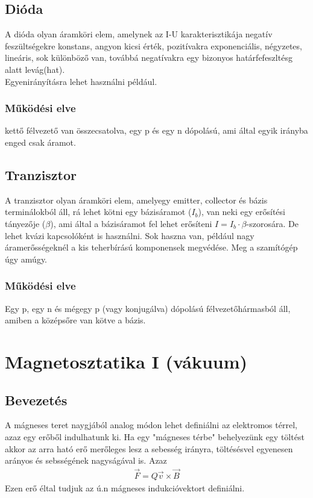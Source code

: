 \documentclass{article}
\begin{document}
\subsection{Dióda}
A dióda olyan áramköri elem, amelynek az I-U karakterisztikája negatív feszültségekre konstans, angyon kicsi érték, pozitívakra exponenciális, négyzetes, lineáris, sok különböző van, továbbá negatívakra egy bizonyos határfefeszltésg alatt levág(hat). \\
Egyenirányításra lehet használni például. \\
\subsubsection{Működési elve}
kettő félvezető van összecsatolva, egy p és egy n dópolású, ami által egyik irányba enged csak áramot.
\subsection{Tranzisztor}
A tranzisztor olyan áramköri elem, amelyegy emitter, collector és bázis terminálokból áll, rá lehet kötni egy bázisáramot ($I_b$), van neki egy erősítési tányezője ($\beta$), ami által a bázisáramot fel lehet erősíteni $I=I_b\cdot\beta$-szorosára. De lehet kvázi kapcsolóként is használni.
Sok haszna van, például nagy áramerősségeknél a kis teherbírású komponensek megvédése. Meg a szamítógép úgy amúgy.
\subsubsection{Működési elve}
Egy p, egy n és mégegy p (vagy konjugálva) dópolású félvezetőhármasból áll, amiben a középsőre van kötve a bázis.
\newpage
\section{Magnetosztatika I (vákuum)}
\subsection{Bevezetés}
A mágneses teret naygjából analog módon lehet definiálni az elektromos térrel, azaz egy erőből indulhatunk ki. Ha egy "mágneses térbe" behelyezünk egy töltést akkor az arra ható erő merőleges lesz a sebesség irányra, töltésésvel egyenesen arányos és sebsségének nagyságával is. Azaz
\begin{gather*}
\vec{F} = Q \vec{v} \times \vec{B}
\end{gather*}
Ezen erő éltal tudjuk az ú.n mágneses indukcióvektort definiálni.
\end{document}
